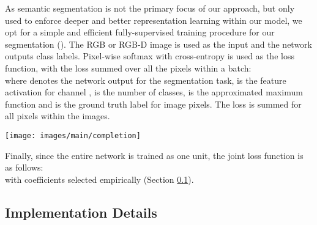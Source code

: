 \documentclass[10pt,twocolumn,letterpaper]{article}
\begin{document}
{As semantic segmentation is not the primary focus of our approach, but only used to enforce deeper and better representation learning within our model, we opt for a simple and efficient fully-supervised training procedure for our segmentation (). The RGB or RGB-D image is used as the input and the network outputs class labels. Pixel-wise softmax with cross-entropy is used as the loss function, with the loss summed over all the pixels within a batch:\vspace{-0.15cm}
\\
where  denotes the network output for the segmentation task,  is the feature activation for channel ,  is the number of classes,  is the approximated maximum function and  is the ground truth label for image pixels. The loss is summed for all pixels within the images.\begin{figure*}[t!]
	\centering
	\texttt{[image: images/main/completion]}
	\captionsetup[figure]{skip=7pt}
	\label{fig:completion}\vspace{-0.4cm}
\end{figure*}


Finally, since the entire network is trained as one unit, the joint loss function is as follows:\vspace{-0.1cm}\\
with coefficients selected empirically (Section \ref{ssec:implementation_approach}).

\subsection{Implementation Details}
\label{ssec:implementation_approach}

}
\end{document}
